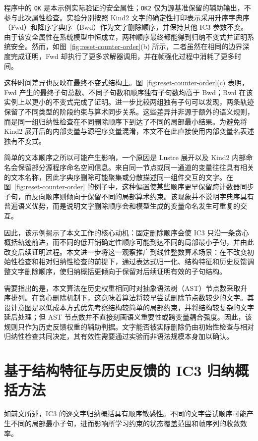 \documentclass[11pt,a4paper]{article}
\begin{document}
程序中的 \texttt{OK} 是本示例实际验证的安全属性；\texttt{OK2} 仅为源基准保留的辅助输出，不参与此次属性检查。实验分别按照 Kind2 文字的确定性打印表示采用升序字典序（Fwd）和降序字典序（Bwd）作为文字删除顺序，并保持其他 IC3 参数不变。由于该安全属性在系统模型中恒成立，两种顺序最终都能得到归纳不变式并证明系统安全。然而，如图~\ref{fig:reset-counter-order}(b) 所示，二者虽然在相同的边界深度完成证明，Fwd 却执行了更多求解器调用，并在帧强化过程中消耗了更多时间。

这种时间差异也反映在最终不变式结构上。图~\ref{fig:reset-counter-order}(c) 表明，Fwd 产生的最终子句总数、不同子句数和顺序独有子句数均高于 Bwd；Bwd 在该实例上以更小的不变式完成了证明。进一步比较两组独有子句可以发现，两条轨迹保留了不同类型的阶段约束与算术同步关系。这些差异并非源于额外的语义规则，而是同一组归纳性检查在不同删除顺序下到达了不同的局部最小结果。为避免将 Kind2 展开后的内部变量与源程序变量混淆，本文不在此直接使用内部变量名表述独有不变式。

简单的文本顺序之所以可能产生影响，一个原因是 Lustre 展开以及 Kind2 内部命名会保留部分源程序命名空间信息。来自同一节点或同一通道的变量往往具有相关的文本名称，因此字典序删除可能聚集或分散描述同一组件交互的文字。在图~\ref{fig:reset-counter-order} 的例子中，这种偏置使某些顺序更早保留跨计数器同步子句，而反向顺序则倾向于保留不同的局部算术约束。该现象并不说明字典序具有普遍语义优势，而是说明文字删除顺序会和模型生成的变量命名发生可重复的交互。

因此，该示例揭示了本文工作的核心动机：固定删除顺序会使 IC3 只沿一条贪心概括轨迹前进，而不同的低开销确定性顺序可能到达不同的局部最小子句，并由此改变后续证明过程。本文进一步将这一观察推广到线性整数算术场景：在不改变初始性检查和相对归纳性检查的前提下，通过表达式归一化、结构特征和历史反馈调整文字删除顺序，使归纳概括更倾向于保留对后续证明有效的子句结构。

需要指出的是，本文算法在历史权重相同时对抽象语法树（AST）节点数采取升序排列。在贪心删除机制下，这意味着算法将较早尝试删除节点数较少的文字。其设计意图是以低成本方式优先考察结构较简单的局部约束，并将结构较复杂的文字延后处理；但 AST 节点数并不直接刻画语义重要性或跨变量耦合强度。因此，该规则只作为历史反馈权重的辅助判据。文字能否被实际删除仍由初始性检查与相对归纳性检查共同决定，其有效性需要通过实验而非语法规模本身加以确认。

\section{基于结构特征与历史反馈的 IC3 归纳概括方法}

如前文所述，IC3 的逐文字归纳概括具有顺序敏感性。不同的文字尝试顺序可能产生不同的局部最小子句，进而影响所学习约束的状态覆盖范围和帧序列的收敛效率。
\end{document}
